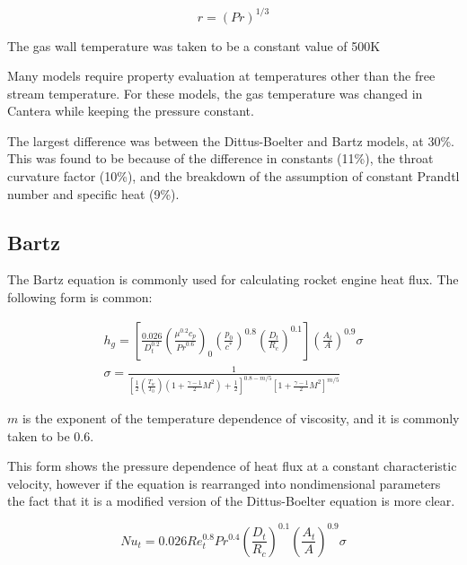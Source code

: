 \documentclass[11pt]{article}
\begin{document}
\begin{equation}
    r = (Pr)^{1/3}
\end{equation}

The gas wall temperature was taken to be a constant value of 500K %

Many models require property evaluation at temperatures other than the free stream temperature. For these models, the gas temperature was changed in Cantera while keeping the pressure constant.


The largest difference was between the Dittus-Boelter and Bartz models, at 30\%. This was found to be because of the difference in constants (11\%), the throat curvature factor (10\%), and the breakdown of the assumption of constant Prandtl number and specific heat (9\%).

\subsection{Bartz}


The Bartz equation is commonly used for calculating rocket engine heat flux. The following form is common:

\begin{equation}
    \label{equation:bartz}
    \begin{split}
         h_g = \left[ \frac{0.026}{D_t^{0.2}} \left( \frac{\mu^{0.2} c_p}{{Pr}^{0.6}} \right)_{0} \left( \frac{p_0}{c^*} \right)^{0.8} \left( \frac{D_t}{R_c} \right)^{0.1} \right] \left( \frac{A_t}{A} \right)^{0.9} \sigma \\
         \sigma = \frac{1}{\left[ \frac{1}{2} \left( \frac{T_{w}}{T_0} \right) \left( 1 + \frac{\gamma - 1}{2} M^2 \right) + \frac{1}{2}\right]^{0.8-m/5} \left[ 1 + \frac{\gamma - 1}{2} M^2 \right]^{m/5}}
    \end{split}
\end{equation}

$m$ is the exponent of the temperature dependence of viscosity, and it is commonly taken to be 0.6.

This form shows the pressure dependence of heat flux at a constant characteristic velocity, however if the equation is rearranged into nondimensional parameters the fact that it is a modified version of the Dittus-Boelter equation is more clear.

\begin{equation}
  Nu_{t} = 0.026 Re_{t}^{0.8} Pr^{0.4} \left( \frac{D_t}{R_c} \right)^{0.1} \left( \frac{A_t}{A} \right)^{0.9} \sigma
\end{equation}
\end{document}
